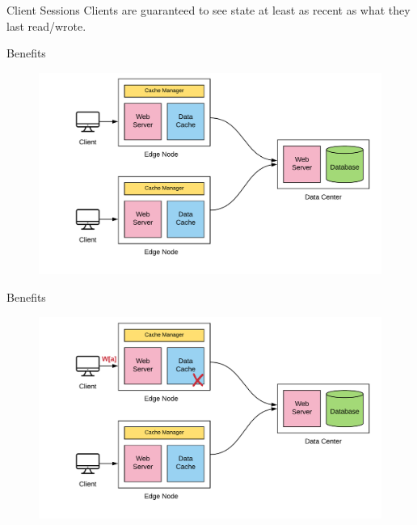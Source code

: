 \documentclass[10pt]{beamer}
\begin{document}
\begin{frame}[fragile]{Client Sessions}
Clients are guaranteed to see state at least as recent as what they last read/wrote.
    \begin{itemize}
    \end{itemize}
\end{frame}

\begin{frame}{Benefits}
    \begin{figure}
        \center
        \hspace*{-1.5cm}
        \includegraphics[scale=0.17]{apollo_ec_dbl}
    \end{figure}
\end{frame}

\begin{frame}{Benefits}
    \begin{figure}
        \center
        \hspace*{-1.5cm}
        \includegraphics[scale=0.17]{apollo_ec_upd}
    \end{figure}
\end{frame}
\end{document}
